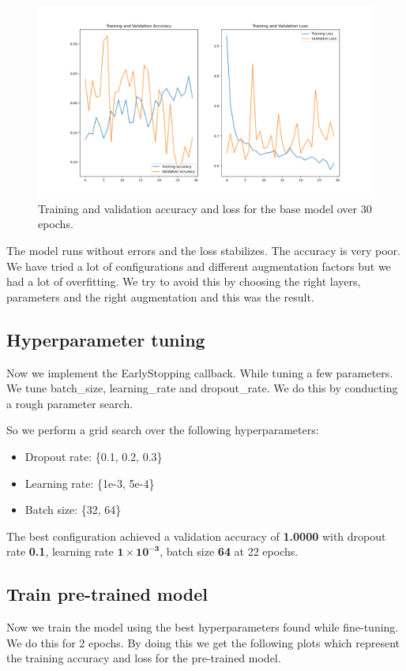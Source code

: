 \documentclass[conference]{IEEEtran}
\begin{document}
\begin{figure}[htbp]
	\centerline{\includegraphics[width=\linewidth]{Images/Transferlearning_1.png}}
	\caption{Training and validation accuracy and loss for the base model over 30 epochs.}
	\label{fig:transferlearning_1}
\end{figure}

The model runs without errors and the loss stabilizes. The accuracy is very poor. We have tried a lot of configurations and different augmentation factors but we had a lot of overfitting. We try to avoid this by choosing the right layers, parameters and the right augmentation and this was the result.\\



\subsection{Hyperparameter tuning}
Now we implement the EarlyStopping callback. While tuning a few parameters. We tune batch\_size, learning\_rate and dropout\_rate. We do this by conducting a rough parameter search.

So we perform a grid search over the following hyperparameters:
\begin{itemize}
	\item Dropout rate: \{0.1, 0.2, 0.3\}
	\item Learning rate: \{1e-3, 5e-4\}
	\item Batch size: \{32, 64\}
\end{itemize}

The best configuration achieved a validation accuracy of \textbf{1.0000} with dropout rate \textbf{0.1}, learning rate \(\mathbf{1\times10^{-3}}\), batch size \textbf{64} at 22 epochs.


\subsection{Train pre-trained model}
Now we train the model using the best hyperparameters found while fine-tuning. We do this for 2 epochs.
By doing this we get the following plots which represent the training accuracy and loss for the pre-trained model.
\end{document}
